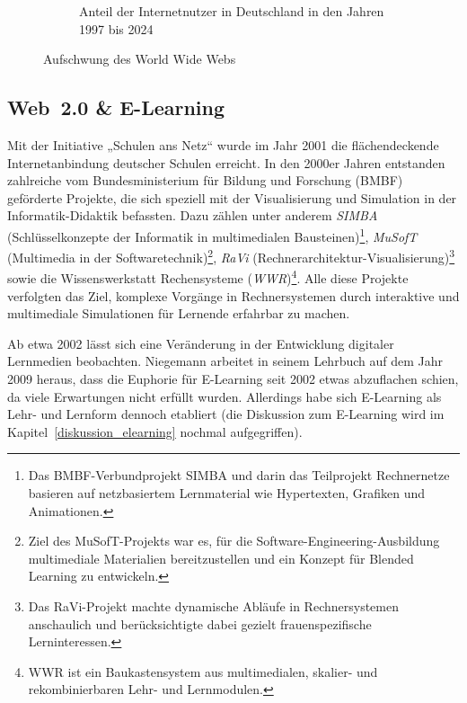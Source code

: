\begin{figure}[h!]
\begin{subfigure}[b]{0.48\textwidth}
        \caption{Anteil der Internetnutzer in Deutschland in den Jahren 1997 bis 2024}
        \label{fig:internetnutzer}
		\cite{statista_anteil_2024}
    \end{subfigure}
    \caption{Aufschwung des World Wide Webs}
    \label{fig:www}
\end{figure}

\subsection{Web~2.0 \& E-Learning}

Mit der Initiative „Schulen ans Netz“\cite{schulen_ans_netz_ev_schulen_nodate} wurde im Jahr 2001 die flächendeckende Internetanbindung deutscher Schulen erreicht\cite{kopcke_internet_2016}. In den 2000er Jahren entstanden zahlreiche vom Bundesministerium für Bildung und Forschung (BMBF) geförderte Projekte, die sich speziell mit der Visualisierung und Simulation in der Informatik-Didaktik befassten. Dazu zählen unter anderem \textit{SIMBA} (Schlüsselkonzepte der Informatik in multimedialen Bausteinen)\footnote{Das BMBF-Verbundprojekt SIMBA und darin das Teilprojekt Rechnernetze basieren auf netzbasiertem Lernmaterial wie Hypertexten, Grafiken und Animationen.\parencite[S.~75]{magenheim_blended_2003}}, \textit{MuSofT} (Multimedia in der Softwaretechnik)\footnote{Ziel des MuSofT-Projekts war es, für die Software-Engineering-Ausbildung multimediale Materialien bereitzustellen und ein Konzept für Blended Learning zu entwickeln.\parencite[S.~73]{magenheim_blended_2003}}, \textit{RaVi} (Rechnerarchitektur-Visualisierung)\footnote{Das RaVi-Projekt machte dynamische Abläufe in Rechnersystemen anschaulich und berücksichtigte dabei gezielt frauenspezifische Lerninteressen.\parencite[S.~20]{marwedel_interaktive_2003}} sowie die Wissenswerkstatt Rechensysteme (\textit{WWR})\footnote{WWR ist ein Baukastensystem aus multimedialen, skalier- und rekombinierbaren Lehr- und Lernmodulen.\parencite[S.~1]{kornelsen_inhalte_2004}}. Alle diese Projekte verfolgten das Ziel, komplexe Vorgänge in Rechnersystemen durch interaktive und multimediale Simulationen für Lernende erfahrbar zu machen.

Ab etwa 2002 lässt sich eine Veränderung in der Entwicklung digitaler Lernmedien beobachten. 
Niegemann arbeitet in seinem Lehrbuch auf dem Jahr 2009 heraus, dass die Euphorie für E-Learning seit 2002 etwas abzuflachen schien, da viele Erwartungen nicht erfüllt wurden. Allerdings habe sich E-Learning als Lehr- und Lernform dennoch etabliert (die Diskussion zum E-Learning wird im Kapitel~\ref{diskussion_elearning} nochmal aufgegriffen).\parencite[S.~14]{niegemann_kompendium_2008}

